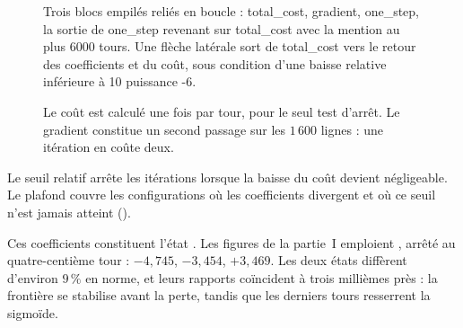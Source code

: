 \begin{figure}[htbp]
\centering
\begin{graphique}{Trois blocs empilés reliés en boucle : total_cost, gradient, one_step, la sortie de one_step revenant sur total_cost avec la mention au plus 6000 tours. Une flèche latérale sort de total_cost vers le retour des coefficients et du coût, sous condition d'une baisse relative inférieure à 10 puissance -6.}
\end{graphique}
\caption{Le coût est calculé une fois par tour, pour le seul test d'arrêt. Le
gradient constitue un second passage sur les $1\,600$ lignes : une itération en
coûte deux.}
\label{fig:boucle}
\end{figure}
\FloatBarrier

Le seuil relatif arrête les itérations lorsque la baisse du coût devient
négligeable. Le plafond couvre les configurations où les coefficients divergent
et où ce seuil n'est jamais atteint ().

Ces coefficients constituent l'état \Mstop. Les figures de la partie~I emploient
\Mquatre, arrêté au quatre-centième tour : $-4{,}745$, $-3{,}454$, $+3{,}469$.
Les deux états diffèrent d'environ $9\,\%$ en norme, et leurs rapports coïncident
à trois millièmes près : la frontière se stabilise avant la perte, tandis que
les derniers tours resserrent la sigmoïde.
